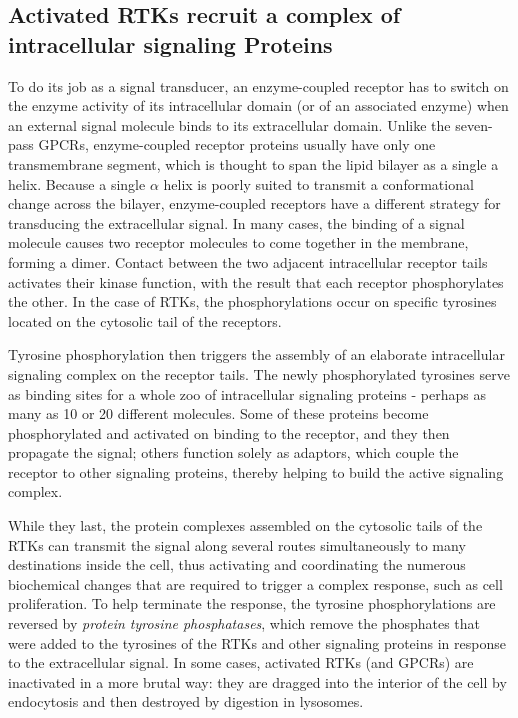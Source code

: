 \subsection{Activated RTKs recruit a complex of intracellular signaling Proteins}

To do its job as a signal transducer, an enzyme-coupled receptor has to
switch on the enzyme activity of its intracellular domain (or of an associated 
enzyme) when an external signal molecule binds to its extracellular
domain. Unlike the seven-pass GPCRs, enzyme-coupled receptor proteins 
usually have only one transmembrane segment, which is thought
to span the lipid bilayer as a single a helix. Because a single $\alpha$ helix is
poorly suited to transmit a conformational change across the bilayer,
enzyme-coupled receptors have a different strategy for transducing the
extracellular signal. In many cases, the binding of a signal molecule
causes two receptor molecules to come together in the membrane, forming 
a dimer. Contact between the two adjacent intracellular receptor tails
activates their kinase function, with the result that each receptor phosphorylates 
the other. In the case of RTKs, the phosphorylations occur on
specific tyrosines located on the cytosolic tail of the receptors.

Tyrosine phosphorylation then triggers the assembly of an elaborate
intracellular signaling complex on the receptor tails. The newly phosphorylated 
tyrosines serve as binding sites for a whole zoo of intracellular
signaling proteins - perhaps as many as 10 or 20 different molecules.
Some of these proteins become phosphorylated and activated 
on binding to the receptor, and they then propagate the signal;
others function solely as adaptors, which couple the receptor to other signaling 
proteins, thereby helping to build the active signaling complex.

While they last, the protein complexes assembled on the cytosolic tails
of the RTKs can transmit the signal along several routes simultaneously
to many destinations inside the cell, thus activating and coordinating the
numerous biochemical changes that are required to trigger a complex
response, such as cell proliferation. To help terminate the response, the
tyrosine phosphorylations are reversed by \textit{protein tyrosine phosphatases},
which remove the phosphates that were added to the tyrosines of the
RTKs and other signaling proteins in response to the extracellular signal.
In some cases, activated RTKs (and GPCRs) are inactivated in a more brutal 
way: they are dragged into the interior of the cell by endocytosis and
then destroyed by digestion in lysosomes.

